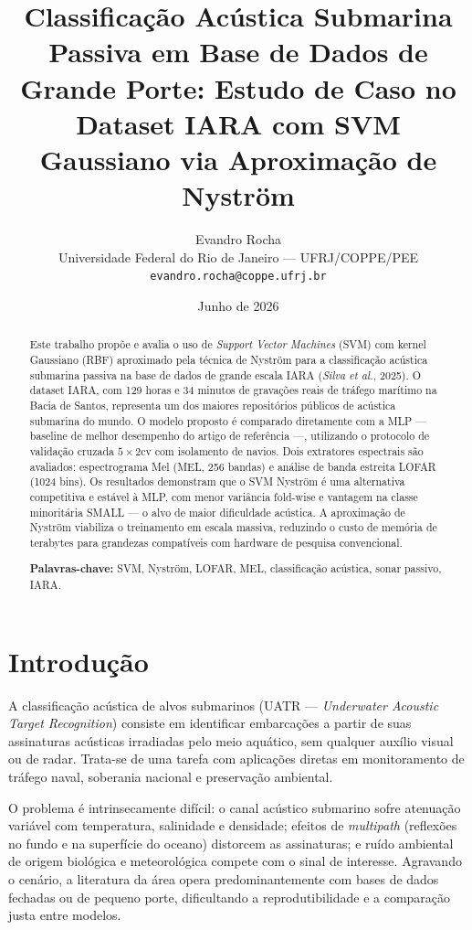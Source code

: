 \documentclass[a4paper,12pt]{article}
\title{\textbf{Classificação Acústica Submarina Passiva em Base de Dados de Grande Porte: Estudo de Caso no Dataset IARA com SVM Gaussiano via Aproximação de Nyström}}
\author{Evandro Rocha\\
\small Universidade Federal do Rio de Janeiro — UFRJ/COPPE/PEE\\
\small \texttt{evandro.rocha@coppe.ufrj.br}}
\date{Junho de 2026}
\begin{document}
\maketitle

\begin{abstract}
\noindent
Este trabalho propõe e avalia o uso de \textit{Support Vector Machines} (SVM) com kernel Gaussiano (RBF) aproximado pela técnica de Nyström para a classificação acústica submarina passiva na base de dados de grande escala IARA (\textit{Silva et al.}, 2025). O dataset IARA, com 129 horas e 34 minutos de gravações reais de tráfego marítimo na Bacia de Santos, representa um dos maiores repositórios públicos de acústica submarina do mundo. O modelo proposto é comparado diretamente com a MLP — baseline de melhor desempenho do artigo de referência —, utilizando o protocolo de validação cruzada $5\times2$cv com isolamento de navios. Dois extratores espectrais são avaliados: espectrograma Mel (MEL, 256 bandas) e análise de banda estreita LOFAR (1024 bins). Os resultados demonstram que o SVM Nyström é uma alternativa competitiva e estável à MLP, com menor variância fold-wise e vantagem na classe minoritária SMALL — o alvo de maior dificuldade acústica. A aproximação de Nyström viabiliza o treinamento em escala massiva, reduzindo o custo de memória de terabytes para grandezas compatíveis com hardware de pesquisa convencional.

\medskip
\noindent\textbf{Palavras-chave:} SVM, Nyström, LOFAR, MEL, classificação acústica, sonar passivo, IARA.
\end{abstract}

\section{Introdução}

A classificação acústica de alvos submarinos (UATR — \textit{Underwater Acoustic Target Recognition}) consiste em identificar embarcações a partir de suas assinaturas acústicas irradiadas pelo meio aquático, sem qualquer auxílio visual ou de radar. Trata-se de uma tarefa com aplicações diretas em monitoramento de tráfego naval, soberania nacional e preservação ambiental.

O problema é intrinsecamente difícil: o canal acústico submarino sofre atenuação variável com temperatura, salinidade e densidade; efeitos de \textit{multipath} (reflexões no fundo e na superfície do oceano) distorcem as assinaturas; e ruído ambiental de origem biológica e meteorológica compete com o sinal de interesse. Agravando o cenário, a literatura da área opera predominantemente com bases de dados fechadas ou de pequeno porte, dificultando a reprodutibilidade e a comparação justa entre modelos.
\end{document}
